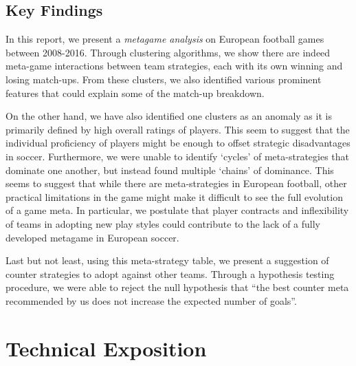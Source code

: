 \documentclass{article}
\begin{document}
\subsection{Key Findings}
In this report, we present a \emph{metagame analysis} on European football games between 2008-2016. Through clustering algorithms, we show there are indeed meta-game interactions between team strategies, each with its own winning and losing match-ups. From these clusters, we also identified various prominent features that could explain some of the match-up breakdown. 
\par On the other hand, we have also identified one clusters as an anomaly as it is primarily defined by high overall ratings of players. This seem to suggest that the individual proficiency of players might be enough to offset strategic disadvantages in soccer. Furthermore, we were unable to identify `cycles' of meta-strategies that dominate one another, but instead found multiple `chains' of dominance. This seems to suggest that while there are meta-strategies in European football, other practical limitations in the game might make it difficult to see the full evolution of a game meta. In particular, we postulate that player contracts and inflexibility of teams in adopting new play styles could contribute to the lack of a fully developed metagame in European soccer.
\par Last but not least, using this meta-strategy table, we present a suggestion of counter strategies to adopt against other teams. Through a hypothesis testing procedure, we were able to reject the null hypothesis that ``the best counter meta recommended by us does not increase the expected number of goals''. 

\section{Technical Exposition}
\end{document}
